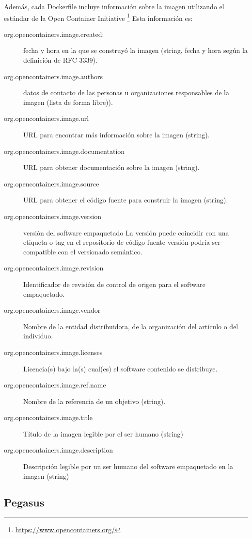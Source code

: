 Además, cada Dockerfile incluye información sobre la imagen utilizando el estándar de la Open Container Initiative \footnote{\url{https://www.opencontainers.org/}} Esta información es:

\begin{description}
   \item[org.opencontainers.image.created:] fecha y hora en la que se construyó la imagen (string, fecha y hora según la definición de RFC 3339).
    \item [org.opencontainers.image.authors] datos de contacto de las personas u organizaciones responsables de la imagen (lista de forma libre)).
    \item [org.opencontainers.image.url] URL para encontrar más información sobre la imagen (string).
    \item [org.opencontainers.image.documentation] URL para obtener documentación sobre la imagen (string).
    \item [org.opencontainers.image.source] URL para obtener el código fuente para construir la imagen (string).
    \item [org.opencontainers.image.version] versión del software empaquetado
        La versión puede coincidir con una etiqueta o tag en el repositorio de código fuente versión podría ser compatible con el versionado semántico.
    \item [org.opencontainers.image.revision] Identificador de revisión de control de origen para el software empaquetado.
    \item [org.opencontainers.image.vendor] Nombre de la entidad distribuidora, de la organización del artículo o del individuo.
    \item [org.opencontainers.image.licenses] Licencia(s) bajo la(s) cual(es) el software contenido se distribuye.
    \item [org.opencontainers.image.ref.name] Nombre de la referencia de un objetivo (string).  
    \item [org.opencontainers.image.title] Título de la imagen legible por el ser humano (string)
    \item [org.opencontainers.image.description] Descripción legible por un ser humano del software empaquetado en la imagen (string)
\end{description}


\subsection{Pegasus}

